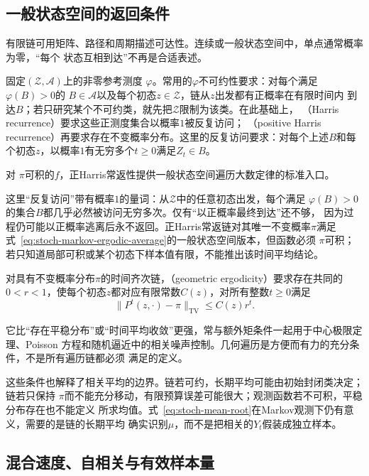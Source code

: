 \subsection{一般状态空间的返回条件}

有限链可用矩阵、路径和周期描述可达性。连续或一般状态空间中，单点通常概率为零，“每个
状态互相到达”不再是合适表述。
\begin{definition}[一般状态空间的不可约性与Harris常返性]
  \label{def:stoch-harris-recurrence}
固定$(\mathcal{Z},\mathcal{A})$上的非零参考测度
$\varphi$。常用的$\varphi$不可约性要求：对每个满足$\varphi(B)>0$的
$B\in\mathcal{A}$以及每个初态$z\in\mathcal{Z}$，链从$z$出发都有正概率在有限时间内
到达$B$；若只研究某个不可约类，就先把$\mathcal{Z}$限制为该类。在此基础上，
（Harris recurrence）要求这些正测度集合以概率$1$被反复访问；
（positive Harris recurrence）再要求存在不变概率分布。这里的反复访问要求：对每个上述\(B\)和每个初态\(z\)，以概率\(1\)有无穷多个\(t\geq0\)满足\(Z_t\in B\)。
\end{definition}
对
$\pi$可积的$f$，正Harris常返性提供一般状态空间遍历大数定律的标准入口。

这里“反复访问”带有概率$1$的量词：从$\mathcal{Z}$中的任意初态出发，每个满足
$\varphi(B)>0$的集合$B$都几乎必然被访问无穷多次。仅有“以正概率最终到达”还不够，
因为过程仍可能以正概率逃离后永不返回。正Harris常返链对其唯一不变概率$\pi$满足
式~\eqref{eq:stoch-markov-ergodic-average}的一般状态空间版本，但函数必须
$\pi$可积；若只知道局部可积或某个初态下样本值有限，不能推出该时间平均结论。

\begin{definition}[几何遍历性]
  \label{def:stoch-geometric-ergodicity}
  对具有不变概率分布\(\pi\)的时间齐次链，（geometric ergodicity）要求存在共同的$0<r<1$，使每个初态\(z\)都对应有限常数$C(z)$，对所有整数\(t\geq0\)满足
\[
  \lVert P^t(z,\cdot)-\pi\rVert_{\mathrm{TV}}
  \leq C(z)r^t.
\]
\end{definition}
它比“存在平稳分布”或“时间平均收敛”更强，常与额外矩条件一起用于中心极限定理、Poisson
方程和随机逼近中的相关噪声控制。几何遍历是方便而有力的充分条件，不是所有遍历链都必须
满足的定义。

这些条件也解释了相关平均的边界。链若可约，长期平均可能由初始封闭类决定；链若只保持
$\pi$而不能充分移动，有限预算误差可能很大；观测函数若不可积，平稳分布存在也不能定义
所求均值。式~\eqref{eq:stoch-mean-root}在Markov观测下仍有意义，需要的是链的长期平均
确实识别$\mu$，而不是把相关的$Y_t$假装成独立样本。

\subsection{混合速度、自相关与有效样本量}


